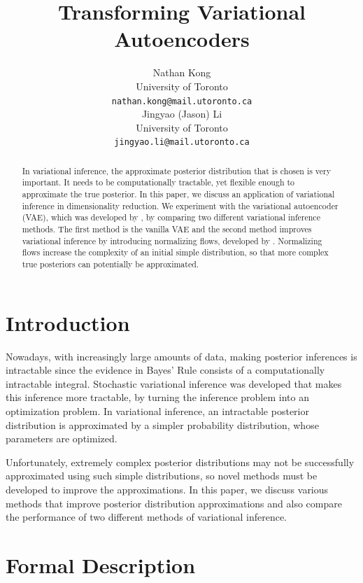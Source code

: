 \documentclass{article}
\title{Transforming Variational Autoencoders}
\author{
  Nathan Kong \\
  University of Toronto\\
  \texttt{nathan.kong@mail.utoronto.ca} \\
  \And
  Jingyao (Jason) Li \\
  University of Toronto \\
  \texttt{jingyao.li@mail.utoronto.ca}\\
}
\begin{document}
\maketitle

\begin{abstract}
In variational inference, the approximate posterior distribution that is chosen is very important.  It
needs to be computationally tractable, yet flexible enough to approximate the true posterior.  In this 
paper, we discuss an application of variational inference in dimensionality reduction.  We experiment
with the variational autoencoder (VAE), which was developed by \citet{KW13}, by comparing two
different variational inference methods.  The first method is the vanilla VAE and the second method
improves variational inference by introducing normalizing flows, developed by \citet{RM15}. Normalizing 
flows increase the complexity of an initial simple distribution, so that more complex true posteriors can
potentially be approximated.
\end{abstract}

\section{Introduction}
Nowadays, with increasingly large amounts of data, making posterior inferences is intractable since 
the evidence in Bayes' Rule consists of a computationally intractable integral.  Stochastic variational 
inference was developed that makes this inference more tractable, by turning the inference problem into
an optimization problem.  In variational inference, an intractable posterior distribution is approximated by
a simpler probability distribution, whose parameters are optimized.  

Unfortunately, extremely complex posterior distributions may not be successfully approximated using 
such simple distributions, so novel methods must be developed to improve the approximations. In this 
paper, we discuss various methods that improve posterior distribution approximations and also compare
the performance of two different methods of variational inference.


\section{Formal Description}
\label{sec:FormalDescription}
\end{document}
